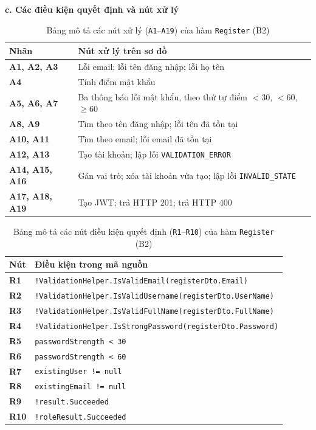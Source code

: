 \documentclass[11pt,a4paper]{article}
\begin{document}
\noindent\textbf{c. Các điều kiện quyết định và nút xử lý}
\begin{table}[H]
\centering
\small
\begin{tabularx}{\textwidth}{|L{3.2cm}|X|}
\hline
{}
\textbf{Nhãn} & \textbf{Nút xử lý trên sơ đồ} \tabularnewline
\hline
\textbf{A1, A2, A3} & Lỗi email; lỗi tên đăng nhập; lỗi họ tên \\ \hline
\textbf{A4} & Tính điểm mật khẩu \\ \hline
\textbf{A5, A6, A7} & Ba thông báo lỗi mật khẩu, theo thứ tự điểm $<30$, $<60$, $\ge 60$ \\ \hline
\textbf{A8, A9} & Tìm theo tên đăng nhập; lỗi tên đã tồn tại \\ \hline
\textbf{A10, A11} & Tìm theo email; lỗi email đã tồn tại \\ \hline
\textbf{A12, A13} & Tạo tài khoản; lập lỗi \texttt{VALIDATION\_ERROR} \\ \hline
\textbf{A14, A15, A16} & Gán vai trò; xóa tài khoản vừa tạo; lập lỗi \texttt{INVALID\_STATE} \\ \hline
\textbf{A17, A18, A19} & Tạo JWT; trả HTTP 201; trả HTTP 400 \\ \hline
\end{tabularx}
\caption{Bảng mô tả các nút xử lý (\texttt{A1}--\texttt{A19}) của hàm \texttt{Register} (B2)}
\end{table}

\begin{table}[H]
\centering
\small
\begin{tabularx}{\textwidth}{|C{1.8cm}|X|}
\hline
{}
\textbf{Nút} & \textbf{Điều kiện trong mã nguồn} \tabularnewline
\hline
\textbf{R1} & \texttt{!ValidationHelper.IsValidEmail(registerDto.Email)} \\ \hline
\textbf{R2} & \texttt{!ValidationHelper.IsValidUsername(registerDto.UserName)} \\ \hline
\textbf{R3} & \texttt{!ValidationHelper.IsValidFullName(registerDto.FullName)} \\ \hline
\textbf{R4} & \texttt{!ValidationHelper.IsStrongPassword(registerDto.Password)} \\ \hline
\textbf{R5} & \texttt{passwordStrength < 30} \\ \hline
\textbf{R6} & \texttt{passwordStrength < 60} \\ \hline
\textbf{R7} & \texttt{existingUser != null} \\ \hline
\textbf{R8} & \texttt{existingEmail != null} \\ \hline
\textbf{R9} & \texttt{!result.Succeeded} \\ \hline
\textbf{R10} & \texttt{!roleResult.Succeeded} \\ \hline
\end{tabularx}
\caption{Bảng mô tả các nút điều kiện quyết định (\texttt{R1}--\texttt{R10}) của hàm \texttt{Register} (B2)}
\end{table}
\end{document}
